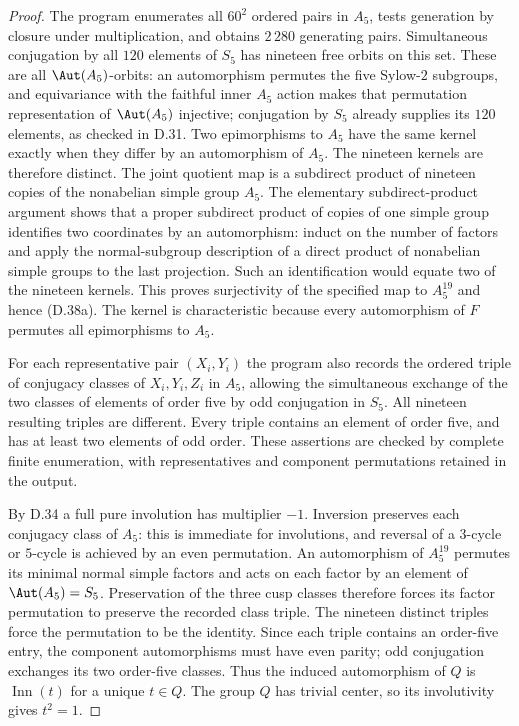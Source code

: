 \begin{proof}
The program enumerates all $60^2$ ordered pairs in $A_5$,
tests generation by closure under multiplication, and
obtains $2\,280$ generating pairs.
Simultaneous conjugation by all $120$ elements of $S_5$
has nineteen free orbits on this set.
These are all $\Aut(A_5)$-orbits: an automorphism
permutes the five Sylow-$2$ subgroups, and equivariance
with the faithful inner $A_5$ action makes that
permutation representation of $\Aut(A_5)$ injective;
conjugation by $S_5$ already supplies its $120$ elements,
as checked in D.31.
Two epimorphisms to $A_5$ have the same kernel exactly
when they differ by an automorphism of $A_5$.
The nineteen kernels are therefore distinct.
The joint quotient map is a subdirect product of
nineteen copies of the nonabelian simple group $A_5$.
The elementary subdirect-product argument shows that
a proper subdirect product of copies of one simple
group identifies two coordinates by an automorphism:
induct on the number of factors and apply the
normal-subgroup description of a direct product of
nonabelian simple groups to the last projection.
Such an identification would equate two of the
nineteen kernels.  This proves surjectivity of the
specified map to $A_5^{19}$ and hence (D.38a).
The kernel is characteristic because every automorphism
of $F$ permutes all epimorphisms to $A_5$.

For each representative pair $(X_i,Y_i)$ the program
also records the ordered triple of conjugacy classes
of $X_i,Y_i,Z_i$ in $A_5$, allowing the simultaneous
exchange of the two classes of elements of order five
by odd conjugation in $S_5$.
All nineteen resulting triples are different.
Every triple contains an element of order five,
and has at least two elements of odd order.
These assertions are checked by complete finite
enumeration, with representatives and component
permutations retained in the output.

By D.34 a full pure involution has multiplier $-1$.
Inversion preserves each conjugacy class of $A_5$:
this is immediate for involutions, and reversal of
a $3$-cycle or $5$-cycle is achieved by an even
permutation.
An automorphism of $A_5^{19}$ permutes its minimal
normal simple factors and acts on each factor by
an element of $\Aut(A_5)=S_5$.
Preservation of the three cusp classes therefore
forces its factor permutation to preserve the
recorded class triple.  The nineteen distinct
triples force the permutation to be the identity.
Since each triple contains an order-five entry,
the component automorphisms must have even parity;
odd conjugation exchanges its two order-five
classes.  Thus the induced automorphism of $Q$
is $\operatorname{Inn}(t)$ for a unique $t\in Q$.
The group $Q$ has trivial center, so its
involutivity gives $t^2=1$.


\end{proof}

